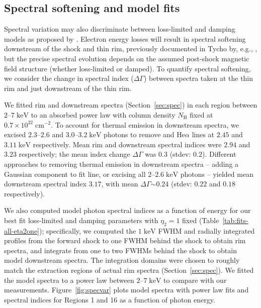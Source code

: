 \documentclass[iop, apj, numberedappendix]{emulateapj}
\newcommand*{\mt}{\mathrm}
\newcommand*{\unit}[1]{\;\mt{#1}}  %
\newcommand*{\abt}{\mathord{\sim}} %
\begin{document}
\subsection{Spectral softening and model fits}

Spectral variation may also discriminate between loss-limited and damping
models as proposed by \citet{rettig2012}.  Electron energy losses will result
in spectral softening downstream of the shock and thin rim, previously
documented in Tycho by, e.g., \citet{cassam-chenai2007}, but the precise
spectral evolution depends on the assumed post-shock magnetic field structure
(whether loss-limited or damped).  To quantify spectral softening, we consider
the change in spectral index ($\Delta \Gamma$) between spectra taken at the
thin rim and just downstream of the thin rim.

We fitted rim and downstream spectra (Section~\ref{sec:spec}) in each region
between $2$--$7 \unit{keV}$ to an absorbed power law with column density
$N_{\mt{H}}$ fixed at $0.7 \times 10^{22} \unit{cm^{-2}}$.  To account for
thermal emission in downstream spectra, we excised $2.3$--$2.6$ and
$3.0$--$3.2 \unit{keV}$ photons to remove  and 
He$\alpha$ lines at $2.45$ and $3.11 \unit{keV}$ respectively.  Mean rim and
downstream spectral indices were $2.94$ and $3.23$ respectively; the mean
index change $\Delta \Gamma$ was $0.3$ (stdev: $0.2$).  Different approaches to
removing thermal emission in downstream spectra -- adding a Gaussian component
to fit  line, or excising all $2$--$2.6 \unit{keV}$ photons --
yielded mean downstream spectral index $3.17$, with mean $\Delta \Gamma \abt
0.24$ (stdev: $0.22$ and $0.18$ respectively).

We also computed model photon spectral indices as a function of energy for our
best fit loss-limited and damping parameters with $\eta_2 = 1$ fixed
(Table~\ref{tab:fits-all-eta2one}); specifically, we computed the $1
\unit{keV}$ FWHM and radially integrated profiles from the forward shock to one
FWHM behind the shock to obtain rim spectra, and integrate from one to two
FWHMs behind the shock to obtain model downstream spectra.  The integration
domains were chosen to roughly match the extraction regions of actual rim
spectra (Section~\ref{sec:spec}).  We fitted the model spectra to a power law
between $2$--$7 \unit{keV}$ to compare with our measurements.
Figure~\ref{fig:specvar} plots model spectra with power law fits and spectral
indices for Regions 1 and 16 as a function of photon energy.
\end{document}
